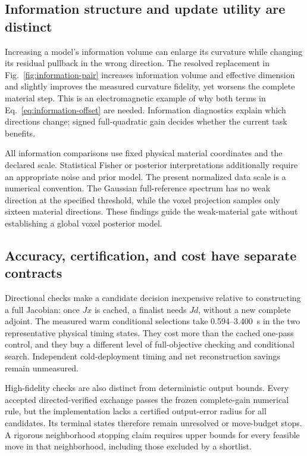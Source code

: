 \subsection{Information structure and update utility are distinct}
Increasing a model's information volume can enlarge its curvature while changing its residual pullback in the wrong direction. The resolved replacement in Fig.~\ref{fig:information-pair} increases information volume and effective dimension and slightly improves the measured curvature fidelity, yet worsens the complete material step. This is an electromagnetic example of why both terms in Eq.~\eqref{eq:information-offset} are needed. Information diagnostics explain which directions change; signed full-quadratic gain decides whether the current task benefits.

All information comparisons use fixed physical material coordinates and the declared scale. Statistical Fisher or posterior interpretations additionally require an appropriate noise and prior model. The present normalized data scale is a numerical convention. The Gaussian full-reference spectrum has no weak direction at the specified threshold, while the voxel projection samples only sixteen material directions. These findings guide the weak-material gate without establishing a global voxel posterior model.

\subsection{Accuracy, certification, and cost have separate contracts}
Directional checks make a candidate decision inexpensive relative to constructing a full Jacobian: once $Jx$ is cached, a finalist needs $Jd$, without a new complete adjoint. The measured warm conditional selections take 0.594--3.400~s in the two representative physical timing states. They cost more than the cached one-pass control, and they buy a different level of full-objective checking and conditional search. Independent cold-deployment timing and net reconstruction savings remain unmeasured.

High-fidelity checks are also distinct from deterministic output bounds. Every accepted directed-verified exchange passes the frozen complete-gain numerical rule, but the implementation lacks a certified output-error radius for all candidates. Its terminal states therefore remain unresolved or move-budget stops. A rigorous neighborhood stopping claim requires upper bounds for every feasible move in that neighborhood, including those excluded by a shortlist.

